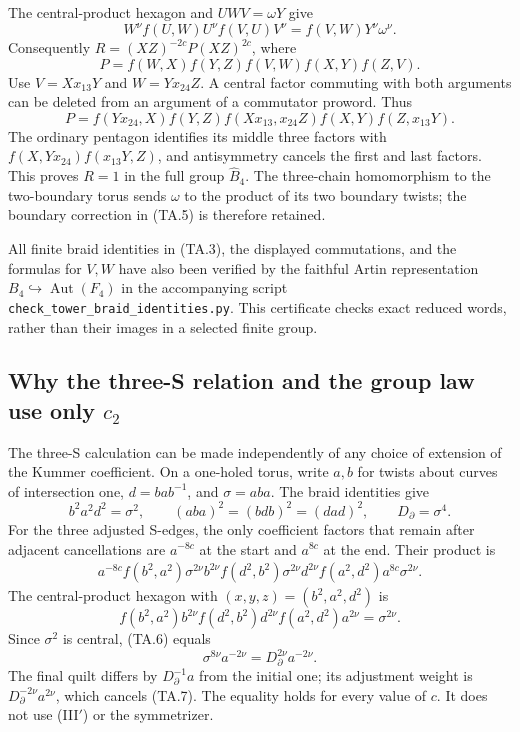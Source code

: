 The central-product hexagon and $UWV=\omega Y$ give
\[
 W^\nu f(U,W)U^\nu f(V,U)V^\nu=f(V,W)Y^\nu\omega^\nu.
\]
Consequently $R=(XZ)^{-2c}P(XZ)^{2c}$, where
\[
 P=f(W,X)f(Y,Z)f(V,W)f(X,Y)f(Z,V).
\]
Use $V=Xx_{13}Y$ and $W=Yx_{24}Z$.  A central factor commuting
with both arguments can be deleted from an argument of a commutator
proword.  Thus
\[
P=f(Yx_{24},X)f(Y,Z)f(Xx_{13},x_{24}Z)f(X,Y)f(Z,x_{13}Y).
\]
The ordinary pentagon identifies its middle three factors with
$f(X,Yx_{24})f(x_{13}Y,Z)$, and antisymmetry cancels the first
and last factors.  This proves $R=1$ in the full group
$\widehat B_4$.  The three-chain homomorphism to the two-boundary
torus sends $\omega$ to the product of its two boundary twists;
the boundary correction in (TA.5) is therefore retained.

All finite braid identities in (TA.3), the displayed commutations,
and the formulas for $V,W$ have also been verified by the faithful
Artin representation $B_4\hookrightarrow\operatorname{Aut}(F_4)$
in the accompanying script
\texttt{check\_tower\_braid\_identities.py}.
This certificate checks exact reduced words, rather than their images
in a selected finite group.

\subsection{Why the three-S relation and the group law use only \texorpdfstring{$c_2$}{c2}}

The three-S calculation can be made independently of any choice of
extension of the Kummer coefficient.  On a one-holed torus, write
$a,b$ for twists about curves of intersection one,
$d=bab^{-1}$, and $\sigma=aba$.  The braid identities give
\[
 b^2a^2d^2=\sigma^2,
 \qquad(aba)^2=(bdb)^2=(dad)^2,
 \qquad D_\partial=\sigma^4.
\]
For the three adjusted S-edges, the only coefficient factors that
remain after adjacent cancellations are $a^{-8c}$ at the start
and $a^{8c}$ at the end.  Their product is
\[
\begin{split}
 a^{-8c}f(b^2,a^2)\sigma^{2\nu}
 b^{2\nu}f(d^2,b^2)\sigma^{2\nu}
 d^{2\nu}f(a^2,d^2)a^{8c}\sigma^{2\nu}.
\end{split}                                                     \tag{TA.6}
\]
The central-product hexagon with $(x,y,z)=(b^2,a^2,d^2)$ is
\[
 f(b^2,a^2)b^{2\nu}f(d^2,b^2)d^{2\nu}
 f(a^2,d^2)a^{2\nu}=\sigma^{2\nu}.
\]
Since $\sigma^2$ is central, (TA.6) equals
\[
              \sigma^{8\nu}a^{-2\nu}
                 =D_\partial^{2\nu}a^{-2\nu}.               \tag{TA.7}
\]
The final quilt differs by $D_\partial^{-1}a$ from the initial
one; its adjustment weight is $D_\partial^{-2\nu}a^{2\nu}$,
which cancels (TA.7).  The equality holds for every value of $c$.
It does not use (III$'$) or the symmetrizer.

